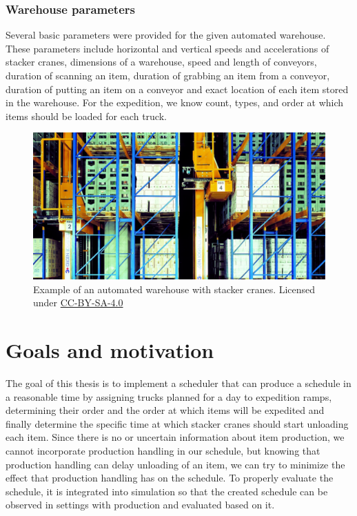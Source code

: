\documentclass{ctuthesis}
\begin{document}
\subsubsection{Warehouse parameters}

Several basic parameters were provided for the given automated warehouse. These parameters include horizontal and vertical speeds and accelerations of stacker cranes, dimensions of a warehouse, speed and length of conveyors, duration of scanning an item, duration of grabbing an item from a conveyor, duration of putting an item on a conveyor and exact location of each item stored in the warehouse. For the expedition, we know count, types, and order at which items should be loaded for each truck. 

\begin{figure}
\includegraphics[width=1\linewidth]{highbaywarehouse.jpg}
\caption{Example of an automated warehouse with stacker cranes. Licensed under \href{https://commons.wikimedia.org/wiki/Category:CC-BY-SA-4.0}{CC-BY-SA-4.0} \cite{warehousepic}}
\label{fig:hb}
\end{figure}

\section{Goals and motivation}

The goal of this thesis is to implement a scheduler that can produce a schedule in a reasonable time by assigning trucks planned for a day to expedition ramps, determining their order and the order at which items will be expedited and finally determine the specific time at which stacker cranes should start unloading each item. Since there is no or uncertain information about item production, we cannot incorporate production handling in our schedule, but knowing that production handling can delay unloading of an item, we can try to minimize the effect that production handling has on the schedule. To properly evaluate the schedule, it is integrated into simulation so that the created schedule can be observed in settings with production and evaluated based on it. 
\end{document}
